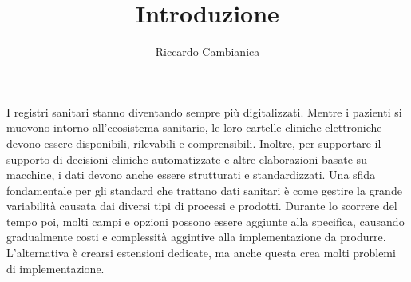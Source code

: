 \documentclass[a4paper]{article}
\title{Introduzione}
\author{Riccardo Cambianica}
\begin{document}
    \maketitle
    I registri sanitari stanno diventando sempre più digitalizzati. Mentre i pazienti si muovono intorno all'ecosistema sanitario, le loro cartelle cliniche 
    elettroniche devono essere disponibili, rilevabili e comprensibili. Inoltre, per supportare il supporto di decisioni cliniche automatizzate e altre elaborazioni 
    basate su macchine, i dati devono anche essere strutturati e standardizzati.
    Una sfida fondamentale per gli standard che trattano dati sanitari è come gestire la grande variabilità causata dai diversi tipi di processi e prodotti.
    Durante lo scorrere del tempo poi, molti campi e opzioni possono essere aggiunte alla specifica, causando gradualmente costi e complessità aggintive alla 
    implementazione da produrre. L'alternativa è crearsi estensioni dedicate, ma anche questa crea molti problemi di implementazione.
\end{document}
